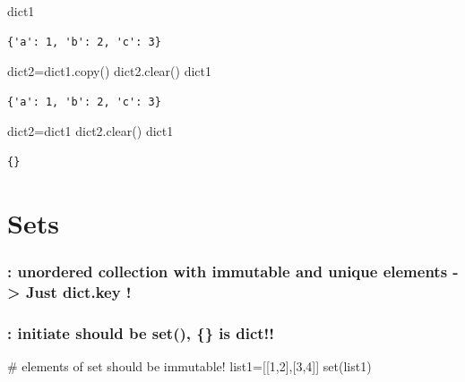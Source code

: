 \documentclass[
  letterpaper,
  DIV=11,
  numbers=noendperiod]{scrreprt}
\newenvironment{Shaded}{\begin{snugshade}}{\end{snugshade}}
\newcommand{\BuiltInTok}[1]{\textcolor[rgb]{0.00,0.23,0.31}{#1}}
\newcommand{\CommentTok}[1]{\textcolor[rgb]{0.37,0.37,0.37}{#1}}
\newcommand{\DecValTok}[1]{\textcolor[rgb]{0.68,0.00,0.00}{#1}}
\newcommand{\NormalTok}[1]{\textcolor[rgb]{0.00,0.23,0.31}{#1}}
\newcommand{\OperatorTok}[1]{\textcolor[rgb]{0.37,0.37,0.37}{#1}}
\begin{document}
\begin{Shaded}
\begin{Highlighting}[]
\NormalTok{dict1}
\end{Highlighting}
\end{Shaded}

\begin{verbatim}
{'a': 1, 'b': 2, 'c': 3}
\end{verbatim}

\begin{Shaded}
\begin{Highlighting}[]
\NormalTok{dict2}\OperatorTok{=}\NormalTok{dict1.copy()}
\NormalTok{dict2.clear()}
\NormalTok{dict1}
\end{Highlighting}
\end{Shaded}

\begin{verbatim}
{'a': 1, 'b': 2, 'c': 3}
\end{verbatim}

\begin{Shaded}
\begin{Highlighting}[]
\NormalTok{dict2}\OperatorTok{=}\NormalTok{dict1}
\NormalTok{dict2.clear()}
\NormalTok{dict1}
\end{Highlighting}
\end{Shaded}

\begin{verbatim}
{}
\end{verbatim}

\section{Sets}\label{sets}

\subsubsection{: unordered collection with immutable and unique elements
-\textgreater{} Just dict.key
!}\label{unordered-collection-with-immutable-and-unique-elements---just-dict.key}

\subsubsection{: initiate should be set(), \{\} is
dict!!}\label{initiate-should-be-set-is-dict}

\begin{Shaded}
\begin{Highlighting}[]
\CommentTok{\# elements of set should be immutable!}
\NormalTok{list1}\OperatorTok{=}\NormalTok{[[}\DecValTok{1}\NormalTok{,}\DecValTok{2}\NormalTok{],[}\DecValTok{3}\NormalTok{,}\DecValTok{4}\NormalTok{]]}
\BuiltInTok{set}\NormalTok{(list1)}
\end{Highlighting}
\end{Shaded}
\end{document}
